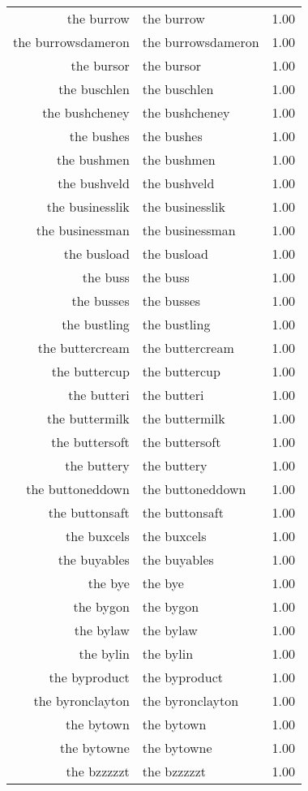 \begin{table}[ht]
\begin{tabular}{rlr}
  the burrow & the burrow & 1.00 \\ 
  the burrowsdameron & the burrowsdameron & 1.00 \\ 
  the bursor & the bursor & 1.00 \\ 
  the buschlen & the buschlen & 1.00 \\ 
  the bushcheney & the bushcheney & 1.00 \\ 
  the bushes & the bushes & 1.00 \\ 
  the bushmen & the bushmen & 1.00 \\ 
  the bushveld & the bushveld & 1.00 \\ 
  the businesslik & the businesslik & 1.00 \\ 
  the businessman & the businessman & 1.00 \\ 
  the busload & the busload & 1.00 \\ 
  the buss & the buss & 1.00 \\ 
  the busses & the busses & 1.00 \\ 
  the bustling & the bustling & 1.00 \\ 
  the buttercream & the buttercream & 1.00 \\ 
  the buttercup & the buttercup & 1.00 \\ 
  the butteri & the butteri & 1.00 \\ 
  the buttermilk & the buttermilk & 1.00 \\ 
  the buttersoft & the buttersoft & 1.00 \\ 
  the buttery & the buttery & 1.00 \\ 
  the buttoneddown & the buttoneddown & 1.00 \\ 
  the buttonsaft & the buttonsaft & 1.00 \\ 
  the buxcels & the buxcels & 1.00 \\ 
  the buyables & the buyables & 1.00 \\ 
  the bye & the bye & 1.00 \\ 
  the bygon & the bygon & 1.00 \\ 
  the bylaw & the bylaw & 1.00 \\ 
  the bylin & the bylin & 1.00 \\ 
  the byproduct & the byproduct & 1.00 \\ 
  the byronclayton & the byronclayton & 1.00 \\ 
  the bytown & the bytown & 1.00 \\ 
  the bytowne & the bytowne & 1.00 \\ 
  the bzzzzzt & the bzzzzzt & 1.00 \\ 

\end{tabular}
\end{table}
